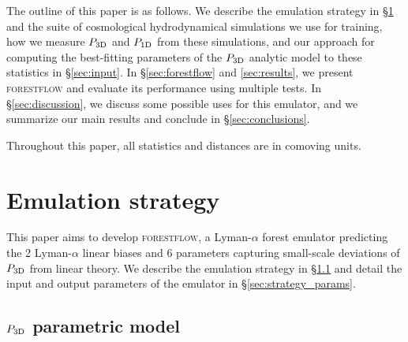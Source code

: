\documentclass{aa}
\newcommand{\lya}{Lyman-$\alpha$\xspace}
\newcommand{\lyaf}{Lyman-$\alpha$ forest\xspace}
\newcommand{\poned}{\ensuremath{P_{\rm 1D}}\xspace}
\newcommand{\pthreed}{\ensuremath{P_{\rm 3D}}\xspace}
\newcommand{\forestflow}{\textsc{forestflow}\xspace}
\providecommand{\DIFaddtex}[1]{{\protect\color{blue}\uwave{#1}}} %
\providecommand{\DIFaddbegin}{} %
\providecommand{\DIFaddend}{} %
\providecommand{\DIFadd}[1]{\texorpdfstring{\DIFaddtex{#1}}{#1}} %
\newcommand{\DIFaddincludegraphics}[2][]{{\color{blue}\fbox{\DIFOincludegraphics[#1]{#2}}}} %
\DeclareRobustCommand{\DIFaddbegin}{\DIFOaddbegin \let\includegraphics\DIFaddincludegraphics} %
\DeclareRobustCommand{\DIFaddend}{\DIFOaddend \let\includegraphics\DIFOincludegraphics} %
\begin{document}
The outline of this paper is as follows. We describe the emulation strategy in \S\ref{sec:strategy} and the suite of cosmological hydrodynamical simulations we use for training, how we measure \pthreed and \poned from these simulations, and our approach for computing the best-fitting parameters of the \pthreed analytic model to these statistics in \S\ref{sec:input}. In \S\ref{sec:forestflow} and \ref{sec:results}, we present \forestflow and evaluate its performance using multiple tests. In \S\ref{sec:discussion}, we discuss some possible uses for this emulator, and we summarize our main results and conclude in \S\ref{sec:conclusions}.

Throughout this paper, all statistics and distances are in comoving units.


\section{Emulation strategy}
\label{sec:strategy}

This paper aims to develop \forestflow, a \lyaf emulator predicting the 2 \lya linear biases \DIFaddbegin \DIFadd{($b_\delta$ and $b_\eta$) }\DIFaddend and 6 parameters capturing small-scale deviations of \pthreed from linear theory. We describe the emulation strategy in \S\ref{sec:strategy_model} and detail the input and output parameters of the emulator in \S\ref{sec:strategy_params}.


\subsection{\pthreed parametric model}
\label{sec:strategy_model}
\end{document}
